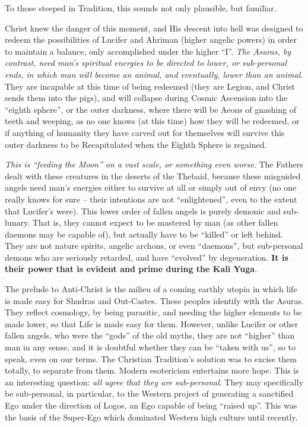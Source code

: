 To those steeped in Tradition, this sounds not only plausible, but familiar.

\begin{quotationx}
Christ knew the danger of this moment, and His descent into hell was designed to redeem the possibilities of Lucifer and Ahriman (higher angelic powers) in order to maintain a balance, only accomplished under the higher ``I''. \emph{The Asuras, by contrast, need man's spiritual energies to be directed to lower, or sub-personal ends, in which man will become an animal, and eventually, lower than an animal}. They are incapable at this time of being redeemed (they are Legion, and Christ sends them into the pigs), and will collapse during Cosmic Ascension into the ``eighth sphere'', or the outer darkness, where there will be Aeons of gnashing of teeth and weeping, as no one knows (at this time) how they will be redeemed, or if anything of humanity they have carved out for themselves will survive this outer darkness to be Recapitulated when the Eighth Sphere is regained.

\emph{This is ``feeding the Moon'' on a vast scale, or something even worse}. The Fathers dealt with these creatures in the deserts of the Thebaid, because these misguided angels need man's energies either to survive at all or simply out of envy (no one really knows for sure -- their intentions are not ``enlightened'', even to the extent that Lucifer's were). This lower order of fallen angels is purely demonic and sub-lunary. That is, they cannot expect to be mastered by man (as other fallen daemons may be capable of), but actually have to be ``killed'' or left behind. They are not nature spirits, angelic archons, or even ``daemons'', but sub-personal demons who are seriously retarded, and have ``evolved'' by degeneration. \textbf{It is their power that is evident and prime during the Kali Yuga}.

The prelude to Anti-Christ is the milieu of a coming earthly utopia in which life is made easy for Shudras and Out-Castes. These peoples identify with the Asuras. They reflect cosmology, by being parasitic, and needing the higher elements to be made lower, so that Life is made easy for them. However, unlike Lucifer or other fallen angels, who were the ``gods'' of the old myths, they are not ``higher'' than man in any sense, and it is doubtful whether they can be ``taken with us'', so to speak, even on our terms. The Christian Tradition's solution was to excise them totally, to separate from them. Modern esotericism entertains more hope. This is an interesting question: \emph{all agree that they are sub-personal}. They may specifically be sub-personal, in particular, to the Western project of generating a sanctified Ego under the direction of Logos, an Ego capable of being ``raised up''. This was the basis of the Super-Ego which dominated Western high culture until recently.


\end{quotationx}
